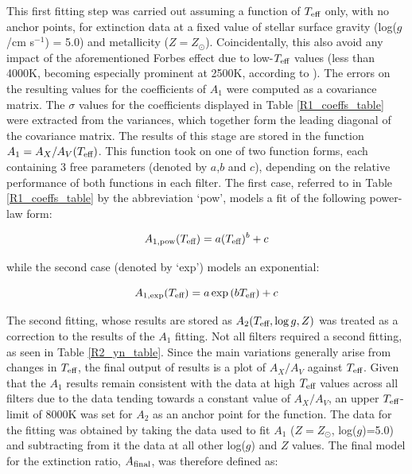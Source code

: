 \documentclass[12pt, a4paper]{report}
\begin{document}
This first fitting step was carried out assuming a function of $T_{\textnormal{eff}}$ only, with no anchor points, for  extinction data at a fixed value of stellar surface gravity (log($g$/cm s$^{-1}$) = 5.0) and metallicity ($Z = Z_{\odot}$). Coincidentally, this also avoid any impact of the aforementioned Forbes effect due to low-$T_{\textnormal{eff}}$ values (less than 4000K, becoming especially prominent at 2500K, according to \cite{2008PASP..120..583G}). The errors on the resulting values for the coefficients of $A_{1}$ were computed as a covariance matrix. The $\sigma$ values for the coefficients displayed in Table \ref{R1_coeffs_table} were extracted from the variances, which together form the leading diagonal of the covariance matrix. The results of this stage are stored in the function $A_{1} = A_{X}/A_{V}(T_{\textnormal{eff}})$. This function took on one of two function forms, each containing 3 free parameters (denoted by $a$,$b$ and $c$), depending on the relative performance of both functions in each filter. The first case, referred to in Table \ref{R1_coeffs_table} by the abbreviation `pow', models a fit of the following power-law form:

\begin{equation}
A_{1,\textnormal{pow}} (T_{\textnormal{eff}}) = a (T_{\textnormal{eff}})^{b} + c
\label{Teff_pow}
\end{equation}

while the second case (denoted by `exp') models an exponential:

\begin{equation}
A_{1,\textnormal{exp}} (T_{\textnormal{eff}}) = a \exp{(b T_{\textnormal{eff}})} + c
\label{Teff_exp}
\end{equation}

The second fitting, whose results are stored as $A_{2}(T_{\textnormal{eff}},\log{g},Z)$ was treated as a correction to the results of the $A_{1}$ fitting. Not all filters required a second fitting, as seen in Table \ref{R2_yn_table}. Since the main variations generally arise from changes in $T_{\textnormal{eff}}$, the final output of results is a plot of $A_{X}/A_{V}$ against $T_{\textnormal{eff}}$. Given that the $A_{1}$ results remain consistent with the data at high $T_{\textnormal{eff}}$ values across all filters due to the data tending towards a constant value of $A_{X}/A_{V}$, an upper $T_{\textnormal{eff}}$-limit of 8000K was set for $A_{2}$ as an anchor point for the function. The data for the fitting was obtained by taking the data used to fit $A_{1}$ ($Z = Z_{\odot}$, log($g$)=5.0) and subtracting from it the data at all other log($g$) and $Z$ values. The final model for the extinction ratio, $A_{\textnormal{final}}$, was therefore defined as:
\end{document}
